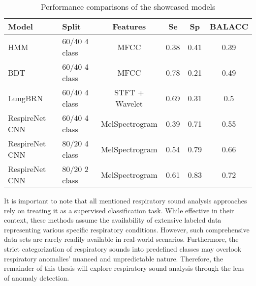 \begin{table}[h!]
    \centering
    \caption{
        Performance comparisons of the showcased models 
    }
    \begin{tabularx}{\linewidth}{lXcccc}
    \toprule
    \textbf{Model}        & \textbf{Split} & \textbf{Features} & \textbf{Se} & \textbf{Sp} & \textbf{BALACC} \\
    \midrule
    HMM                   & 60/40 4 class          & MFCC              & 0.38                & 0.41                 & 0.39 \\
    BDT                   & 60/40 4 class          & MFCC              & 0.78                & 0.21                 & 0.49 \\
    LungBRN               & 60/40 4 class          & STFT + Wavelet    & 0.69                & 0.31                 & 0.5  \\
    RespireNet CNN        & 60/40 4 class          & MelSpectrogram    & 0.39                & 0.71                 & 0.55 \\
    RespireNet CNN        & 80/20 4 class  & MelSpectrogram    & 0.54                & 0.79                 & 0.66 \\
    RespireNet CNN        & 80/20 2 class  & MelSpectrogram    & 0.61                & 0.83                 & 0.72 \\
    \bottomrule
    \end{tabularx}
\end{table}
    
It is important to note that all mentioned respiratory sound analysis approaches rely on treating it as a supervised classification task. While effective in their context, these methods assume the availability of extensive labeled data representing various specific respiratory conditions. However, such comprehensive data sets are rarely readily available in real-world scenarios. Furthermore, the strict categorization of respiratory sounds into predefined classes may overlook respiratory anomalies' nuanced and unpredictable nature. Therefore, the remainder of this thesis will explore respiratory sound analysis through the lens of anomaly detection.

